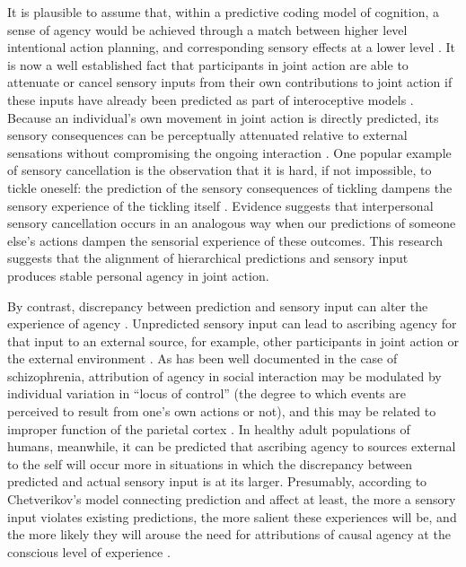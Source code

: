 \begin{CJK}{UTF8}{gbsn}
It is plausible to assume that, within a predictive coding model of cognition, a sense of agency would be achieved through a match between higher level intentional action planning, and corresponding sensory effects at a lower level \citep{VanderWel2012}.  It is now a well established fact that participants in joint action are able to attenuate or cancel sensory inputs from their own contributions to joint action if these inputs have already been predicted as part of interoceptive models \citep{Blakemore2005}.  Because an individual's own movement in joint action is directly predicted, its sensory consequences can be perceptually attenuated relative to external sensations without compromising the ongoing interaction \citep{Blakemore1999}. One popular example of sensory cancellation is the observation that it is hard, if not impossible, to tickle oneself: the prediction of the sensory consequences of tickling dampens the sensory experience of the tickling itself \citep{Frith2007}.  Evidence suggests that interpersonal sensory cancellation occurs in an analogous way when our predictions of someone else’s actions dampen the sensorial experience of these outcomes\citep{Sato2008}.  This research suggests that the alignment of hierarchical predictions and sensory input produces stable personal agency in joint action.

By contrast, discrepancy between prediction and sensory input can alter the experience of agency \citep{Sato2008}.  Unpredicted sensory input can lead to ascribing agency for that input to an external source, for example, other participants in joint action or the external environment \citep{Sato2005,Frith2007}.  As has been well documented in the case of schizophrenia, attribution of agency in social interaction may be modulated by individual variation in ``locus of control'' (the degree to which events are perceived to result from one’s own actions or not), and this may be related to improper function of the parietal cortex \citep{Frith2000}. In healthy adult populations of humans, meanwhile, it can be predicted that ascribing agency to sources external to the self will occur more in situations in which the discrepancy between predicted and actual sensory input is at its larger.  Presumably, according to Chetverikov's model connecting prediction and affect at least, the more a sensory input violates existing predictions, the more salient these experiences will be, and the more likely they will arouse the need for attributions of causal agency at the conscious level of experience \citep{Pesquita2017}.


\end{CJK}
